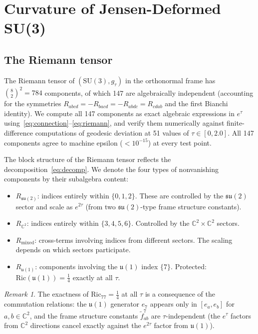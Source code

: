 \documentclass[12pt]{article}
\theoremstyle{definition}
\theoremstyle{remark}
\newtheorem{remark}[theorem]{Remark}
\begin{document}
\section{Curvature of Jensen-Deformed SU(3)}
\label{sec:curvature}

\subsection{The Riemann tensor}

The Riemann tensor of $(\mathrm{SU}(3),g_\tau)$ in the orthonormal frame has $\binom{8}{2}^2 = 784$ components, of which 147 are algebraically independent (accounting for the symmetries $R_{abcd}=-R_{bacd}=-R_{abdc}=R_{cdab}$ and the first Bianchi identity).  We compute all 147 components as exact algebraic expressions in $e^{\tau}$ using~\eqref{eq:connection}--\eqref{eq:riemann}, and verify them numerically against finite-difference computations of geodesic deviation at 51 values of $\tau\in[0,2.0]$.  All 147 components agree to machine epsilon ($<10^{-15}$) at every test point.

The block structure of the Riemann tensor reflects the decomposition~\eqref{eq:decomp}.  We denote the four types of nonvanishing components by their subalgebra content:
\begin{itemize}
    \item $R_{\mathfrak{su}(2)}$: indices entirely within $\{0,1,2\}$.  These are controlled by the $\mathfrak{su}(2)$ sector and scale as $e^{2\tau}$ (from two $\mathfrak{su}(2)$-type frame structure constants).
    \item $R_{\mathbb{C}^2}$: indices entirely within $\{3,4,5,6\}$.  Controlled by the $\mathbb{C}^2\times\mathbb{C}^2$ sectors.
    \item $R_{\mathrm{mixed}}$: cross-terms involving indices from different sectors.  The scaling depends on which sectors participate.
    \item $R_{\mathfrak{u}(1)}$: components involving the $\mathfrak{u}(1)$ index $\{7\}$.  Protected: $\mathrm{Ric}(\mathfrak{u}(1))=\tfrac{1}{4}$ exactly at all $\tau$.
\end{itemize}

\begin{remark}
The exactness of $\mathrm{Ric}_{77}=\tfrac{1}{4}$ at all $\tau$ is a consequence of the commutation relations: the $\mathfrak{u}(1)$ generator $e_7$ appears only in $[e_a,e_b]$ for $a,b\in\mathbb{C}^2$, and the frame structure constants $\tilde{f}^7_{ab}$ are $\tau$-independent (the $e^{\tau}$ factors from $\mathbb{C}^2$ directions cancel exactly against the $e^{2\tau}$ factor from $\mathfrak{u}(1)$).
\end{remark}
\end{document}
